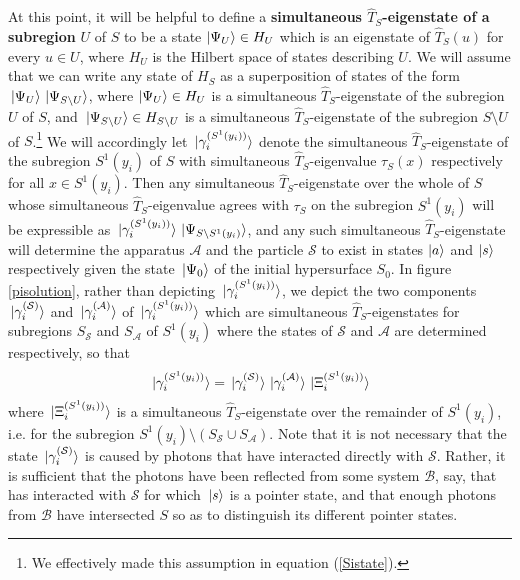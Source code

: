At this point, it will be helpful to define a \textbf{simultaneous $\hat{T}_S$-eigenstate of a subregion} $U$ of $S$ to be a state $\ket{\Psi_U}\in H_U$  which is an eigenstate of $\hat{T}_S(u)$ for every $u\in U$, where $H_U$ is the Hilbert space of states describing $U$. We will assume that we can write any state of $H_S$ as a superposition of states of the form $\ket*{\Psi_U}\ket*{\Psi_{S\setminus U}}$, where $\ket{\Psi_U}\in H_U $ is  a simultaneous $\hat{T}_S$-eigenstate of the subregion $U$ of $S$, and $\ket*{\Psi_{S\setminus U}}\in H_{S\setminus U}$ is a simultaneous
$\hat{T}_S$-eigenstate of the subregion $S\setminus U$ of $S$.\footnote{We effectively made this assumption in equation (\ref{Sistate}).} We will accordingly let  
$\ket*{\gamma^{(S^1(y_i))}_i}$ denote the simultaneous $\hat{T}_S$-eigenstate of the subregion $S^1(y_i)$ of $S$ with simultaneous $\hat{T}_S$-eigenvalue $\tau_S(x)$ respectively for all $x\in S^1(y_i)$. Then any  simultaneous $\hat{T}_S$-eigenstate over the whole of $S$  whose simultaneous $\hat{T}_S$-eigenvalue agrees with 
$\tau_S$ on the subregion $S^1(y_i)$ will be expressible as
$\ket*{\gamma^{(S^1(y_i))}_i}\ket*{\Psi_{S\setminus S^1(y_i)}}$, 
and any such simultaneous $\hat{T}_S$-eigenstate will determine the apparatus $\mathcal{A}$ and the particle $\mathcal{S}$ to exist in states $\ket{a}$ and $\ket{s}$ respectively given the state $\ket*{\Psi_0}$ of the initial hypersurface $S_0$. In figure \ref{pisolution}, rather than depicting $\ket*{\gamma^{(S^1(y_i))}_i}$, we depict the two components $\ket*{\gamma^{(\mathcal{S})}_i}$ and $\ket*{\gamma^{(\mathcal{A})}_i}$ of $\ket*{\gamma^{(S^1(y_i))}_i}$ which are simultaneous $\hat{T}_S$-eigenstates for subregions $S_{\mathcal{S}}$ and $S_{\mathcal{A}}$ of $S^1(y_i)$ where the states of $\mathcal{S}$ and $\mathcal{A}$ are determined respectively, so that 
\begin{equation}\label{gammadecomp}
\ket*{\gamma^{(S^1(y_i))}_i}=\ket*{\gamma^{(\mathcal{S})}_i}\ket*{\gamma^{(\mathcal{A})}_i}\ket*{\Xi^{(S^1(y_i))}_i}
\end{equation}
where $\ket*{\Xi^{(S^1(y_i))}_i}$ is a simultaneous $\hat{T}_S$-eigenstate over the remainder of $S^1(y_i)$, i.e. for the subregion $S^1(y_i)\setminus(S_{\mathcal{S}}\cup S_{\mathcal{A}})$. Note that it is not necessary that the state $\ket*{\gamma^{(\mathcal{S})}_i}$ is caused by photons that have interacted directly with $\mathcal{S}$. Rather, it is sufficient that the photons have been reflected from some system $\mathcal{B}$, say, that has interacted with $\mathcal{S}$ for which $\ket*{s}$ is a pointer state, and that enough photons from $\mathcal{B}$ have intersected $S$ so as to distinguish its different pointer states. 

